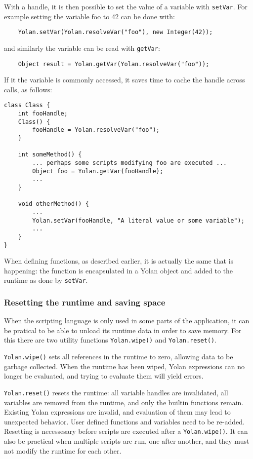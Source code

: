 \documentclass[11pt]{report}
\begin{document}
With a handle, it is then possible to set the value of a variable with \verb|setVar|. For example setting the variable foo to 42 can be done with:
\begin{lstlisting}
    Yolan.setVar(Yolan.resolveVar("foo"), new Integer(42));
\end{lstlisting} 
and similarly the variable can be read with \verb|getVar|:
\begin{lstlisting}
    Object result = Yolan.getVar(Yolan.resolveVar("foo"));
\end{lstlisting}

If it the variable is commonly accessed, it saves time to cache the handle across calls, as follows:
\begin{lstlisting}
class Class {
    int fooHandle;
    Class() {
        fooHandle = Yolan.resolveVar("foo");
    }

    int someMethod() {
        ... perhaps some scripts modifying foo are executed ...
        Object foo = Yolan.getVar(fooHandle);
        ...
    }

    void otherMethod() {
        ... 
        Yolan.setVar(fooHandle, "A literal value or some variable");
        ...
    }
}
\end{lstlisting}
When defining functions, as described earlier, it is actually the same that is happening: the function is encapsulated in a Yolan object and added to the runtime as done by \verb|setVar|.

\subsubsection{Resetting the runtime and saving space}
When the scripting language is only used in some parts of the application, it can be pratical to be able to unload its runtime data in order to save memory. 
For this there are two utility functions \verb|Yolan.wipe()| and \verb|Yolan.reset()|.

\verb|Yolan.wipe()| sets all references in the runtime to zero, allowing data to be garbage collected.
When the runtime has been wiped, Yolan expressions can no longer be evaluated, and trying to evaluate them will yield errors. 

\verb|Yolan.reset()| resets the runtime: all variable handles are invalidated, all variables are removed from the runtime, and only the builtin functions remain. Existing Yolan expressions are invalid, and evaluation of them may lead to unexpected behavior. User defined functions and variables need to be re-added.
Resetting is necessesary before scripts are executed after a \verb|Yolan.wipe()|.
It can also be practical when multiple scripts are run, one after another, and they must not modify the runtime for each other.
\end{document}
